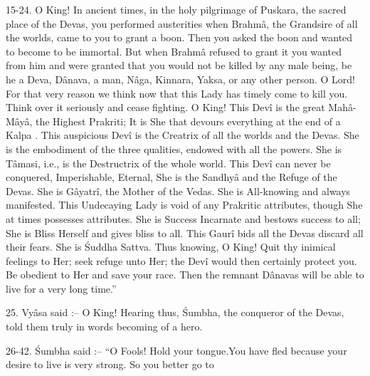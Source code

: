15-24. O King! In ancient times, in the holy pilgrimage of Puskara, the sacred place of the Devas, you performed austerities when Brahm\^a, the Grandsire of all the worlds, came to you to grant a boon. Then you asked the boon and wanted to become to be immortal. But when Brahm\^a refused to grant it you wanted from him and were granted that you would not be killed by any male being, be he a Deva, D\^anava, a man, N\^aga, Kinnara, Yaksa, or any other person. O Lord! For that very reason we think now that this Lady has timely come to kill you. Think over it seriously and cease fighting. O King! This Dev\^i is the great Mah\^a-M\^ay\^a, the Highest Prakriti; It is She that devours everything at the end of a Kalpa . This auspicious Dev\^i is the Creatrix of all the worlds and the Devas. She is the embodiment of the three qualities, endowed with all the powers. She is T\^amasi, i.e., is the Destructrix of the whole world. This Dev\^i can never be conquered, Imperishable, Eternal, She is the Sandhy\^a and the Refuge of the Devas. She is G\^ayatr\^i, the Mother of the Vedas. She is All-knowing and always manifested. This Undecaying Lady is void of any Prakritic attributes, though She at times possesses attributes. She is Success Incarnate and bestows success to all; She is Bliss Herself and gives bliss to all. This Gaur\^i bids all the Devas discard all their fears. She is \'Suddha Sattva. Thus knowing, O King! Quit thy inimical feelings to Her; seek refuge unto Her; the Dev\^i would then certainly protect you. Be obedient to Her and save your race. Then the remnant D\^anavas will be able to live for a very long time.''

25. Vy\^asa said :-- O King! Hearing thus, \'Sumbha, the conqueror of the Devas, told them truly in words becoming of a hero.

26-42. \'Sumbha said :-- ``O Fools! Hold your tongue.You have fled because your desire to live is very strong. So you better go to

